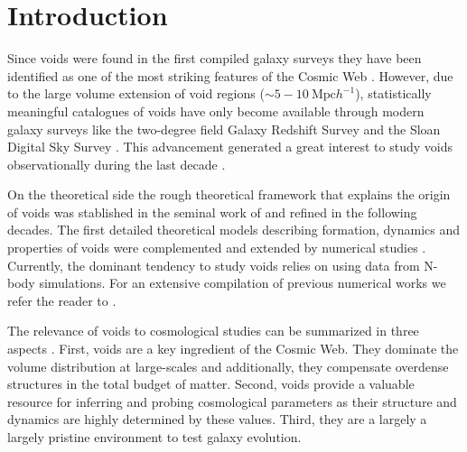 \documentclass[a4,useAMS,usenatbib,usegraphicx]{latex/mn2e}
\begin{document}
\section{Introduction}
\label{sec:introduction}


Since voids were found in the first compiled galaxy surveys 
they have been identified as one of the most striking features of the
Cosmic Web \citep{Chincarini75,  Gregory78, Einasto80M, Einasto80N,
  Kirshner81, Zeldovich82,Kirshner87, Bond96}. 
However,  due to the large volume extension of void regions ($\sim
5-10\ \mbox{Mpc}  h^{-1}$), statistically meaningful catalogues of
voids \citep{Pan10,  Sutter12b, Nadathur14} have only become available
through  modern galaxy surveys like the two-degree field Galaxy
Redshift Survey \citep{ Colless01, Colless03} and the Sloan Digital
Sky Survey \citep{York00, Abazajian03}.
This advancement generated a great interest to study voids
observationally during the last decade \citep{Hoyle04, Croton04, Rojas05,
  Ceccarelli06, Patiri06a, Tikhonov06, Patiri06b,Tikhonov07,
  BendaBeckmann08, Foster09, Ceccarelli13, Sutter14a}. 


On the theoretical side the rough theoretical framework that explains
the origin of voids was stablished in the seminal work of
\citet{Zeldovich70} and refined in the following decades.  
The first detailed theoretical models describing formation, dynamics
and properties of  voids \citep{Hoffman82, Icke84, Bertschinger85,
  Blumenthal92} were  complemented and extended by numerical studies
\citep{Martel90, Regos91, Weygaert93, Dubinski93, Bond96}. 
Currently, the dominant tendency to study voids relies on using data
from N-body simulations. For an extensive compilation of previous 
numerical works we refer the reader to \citet{Colberg08}.


The relevance of voids to cosmological studies can be summarized in
three aspects \citep{Platen07}. 
First, voids are a key ingredient of the Cosmic Web. 
They dominate the volume distribution at large-scales and
additionally, they compensate overdense structures in the total budget
of  matter.  
Second, voids provide a valuable resource for inferring and probing 
cosmological parameters as their structure and dynamics are highly 
determined by these values. 
Third, they are a  largely a largely pristine environment to test
galaxy evolution.
\end{document}
